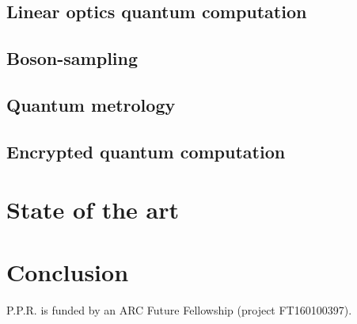 \documentclass[aps,rmp,twocolumn,amsmath,amssymb,nofootinbib,superscriptaddress]{revtex4}
\newcommand{\comment}[1]{{\color{blue}{#1}}}
\begin{document}
\subsection{Linear optics quantum computation}

\subsection{Boson-sampling}

\subsection{Quantum metrology}

\comment{Discuss NOON states - Heisenberg limited}

\comment{Discuss MORDOR scheme}

\subsection{Encrypted quantum computation}

\section{State of the art}

\comment{Discuss where experiments are at at the moment}

\section{Conclusion}

%
%

\begin{acknowledgments}
P.P.R. is funded by an ARC Future Fellowship (project FT160100397).
\end{acknowledgments}

%
%


\end{document}
